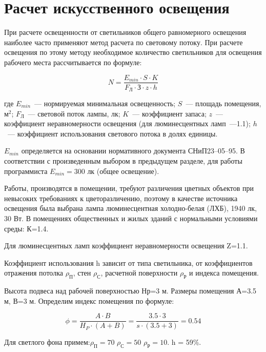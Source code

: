 \section{Расчет искусственного освещения}

При расчете освещенности от светильников общего равномерного освещения наиболее часто применяют метод расчета по световому потоку. При расчете освещения по этому методу необходимое количество светильников для освещения рабочего места рассчитывается по формуле:

\begin{equation}
\label{f:lightsCount}
N = \frac{E_{min}\cdot S\cdot K}{F_\text{Л} \cdot \text{З} \cdot z \cdot h}
\end{equation}

где $E_{min}$~--- нормируемая минимальная освещенность; $S$~--- площадь помещения, $\text{м}^2$; $F_\text{Л}$~--- световой поток лампы, лк; $K$~--- коэффициент запаса; $z$~--- коэффициент неравномерности освещения (для люминесцентных ламп~---1.1); $h$~--- коэффициент использования светового потока в долях единицы.

$E_{min}$ определяется на основании нормативного документа СНиП23--05--95. В соответствии с произведенным выбором в предыдущем разделе, для работы программиста $E_{min}=300$ лк (общее освещение).

Работы, производятся в помещении, требуют различения цветных объектов при невысоких требованиях к цветоразличению, поэтому в качестве источника освещения была выбрана лампа люминесцентная холодно-белая (ЛХБ), 1940 лк, 30 Вт. В помещениях общественных и жилых зданий с нормальными условиями среды: К=1.4.

Для люминесцентных ламп коэффициент неравномерности освещения Z=1.1.

Коэффициент использования h зависит от типа светильника, от коэффициентов отражения потолка $\rho_\text{П}$, стен $\rho_\text{С}$, расчетной поверхности $\rho_\text{Р}$ и индекса помещения.

Высота подвеса над рабочей поверхностью Нр=3 м. Размеры помещения А=3.5 м, В=3 м. Определим индекс помещения по формуле:

\begin{equation}
\phi = \frac{A \cdot B}{H_P \cdot (A + B)} = \frac{3.5 \cdot 3}{s \cdot (3.5 + 3)} = 0.54
\end{equation}

Для светлого фона примем:$\rho_\text{П} = 70$ $\rho_\text{С} = 50$ $\rho_\text{Р} = 10$. h = 59\%.


